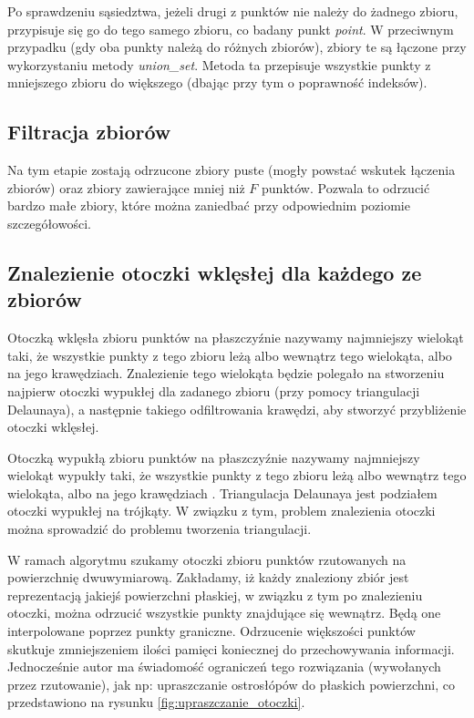 Po sprawdzeniu sąsiedztwa, jeżeli drugi z punktów nie należy do żadnego zbioru, przypisuje się go do tego samego zbioru, co badany punkt \textit{point}.
W przeciwnym przypadku (gdy oba punkty należą do różnych zbiorów), zbiory te są łączone przy wykorzystaniu metody \textit{union\_set}.
Metoda ta przepisuje wszystkie punkty z mniejszego zbioru do większego (dbając przy tym o poprawność indeksów).

\subsection{Filtracja zbiorów}

Na tym etapie zostają odrzucone zbiory puste (mogły powstać wskutek łączenia zbiorów) oraz zbiory zawierające
mniej niż $F$ punktów. Pozwala to odrzucić bardzo małe zbiory, które można zaniedbać przy odpowiednim
poziomie szczegółowości.

\subsection{Znalezienie otoczki wklęsłej dla każdego ze zbiorów}

Otoczką wklęsła zbioru punktów na płaszczyźnie nazywamy najmniejszy wielokąt taki, że wszystkie punkty z tego
zbioru leżą albo wewnątrz tego wielokąta, albo na jego krawędziach. Znalezienie tego wielokąta będzie polegało na
stworzeniu najpierw otoczki wypukłej dla zadanego zbioru (przy pomocy triangulacji Delaunaya), a następnie takiego
odfiltrowania krawędzi, aby stworzyć przybliżenie otoczki wklęsłej.

Otoczką wypukłą zbioru punktów na płaszczyźnie nazywamy najmniejszy wielokąt wypukły taki, że wszystkie punkty z tego
zbioru leżą albo wewnątrz tego wielokąta, albo na jego krawędziach \cite{website:OtoczkaTriangulacja}.
Triangulacja Delaunaya jest podziałem otoczki wypukłej na trójkąty. W związku z tym, problem znalezienia otoczki
można sprowadzić do problemu tworzenia triangulacji.

W ramach algorytmu szukamy otoczki zbioru punktów rzutowanych na powierzchnię dwuwymiarową.
Zakładamy, iż każdy znaleziony zbiór jest reprezentacją jakiejś powierzchni płaskiej,
w związku z tym po znalezieniu otoczki, można odrzucić wszystkie punkty znajdujące się wewnątrz.
Będą one interpolowane poprzez punkty graniczne.
Odrzucenie większości punktów skutkuje zmniejszeniem ilości pamięci koniecznej do przechowywania informacji. Jednocześnie autor ma
świadomość ograniczeń tego rozwiązania (wywołanych przez rzutowanie), jak np: upraszczanie ostrosłópów do płaskich powierzchni, co przedstawiono
na rysunku \ref{fig:upraszczanie_otoczki}.

